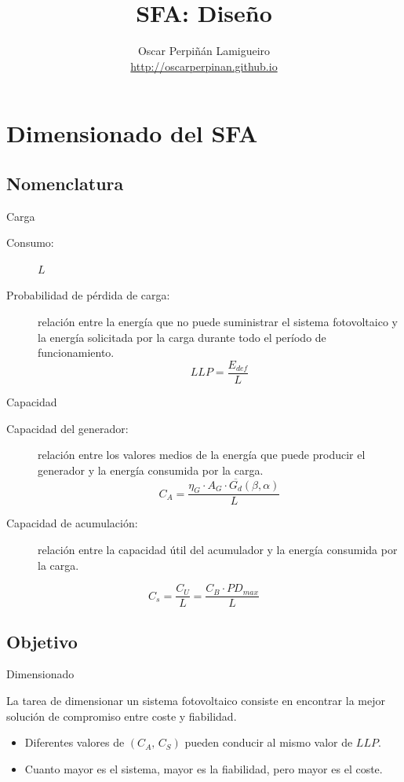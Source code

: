 \documentclass[xcolor={usenames,svgnames,dvipsnames}]{beamer}
\author{Oscar Perpiñán Lamigueiro \\ \url{http://oscarperpinan.github.io}}
\date{}
\title{SFA: Diseño}
\begin{document}
\maketitle

\section{Dimensionado del SFA}
\label{sec-1}

\subsection{Nomenclatura}
\label{sec-1-1}
\begin{frame}[label=sec-1-1-1]{Carga}
\begin{description}
\item[{Consumo:}] $L$

\item[{Probabilidad de pérdida de carga:}] relación entre la energía que no
puede suministrar el sistema fotovoltaico y la energía solicitada por
la carga durante todo el período de
funcionamiento.$$LLP=\frac{E_{def}}{L}$$
\end{description}
\end{frame}

\begin{frame}[label=sec-1-1-2]{Capacidad}
\begin{description}
\item[{Capacidad del generador:}] relación entre los valores medios de la
energía que puede producir el generador y la energía consumida por la
carga.
$$C_{A}=\frac{\eta_{G}\cdot A_{G}\cdot\overline{G_{d}}(\beta,\alpha)}{L}$$

\item[{Capacidad de acumulación:}] relación entre la capacidad útil del acumulador y la energía consumida por la carga.
\end{description}
$$C_{s}=\frac{C_{U}}{L}=\frac{C_{B}\cdot PD_{max}}{L}$$
\end{frame}

\subsection{Objetivo}
\label{sec-1-2}
\begin{frame}[label=sec-1-2-1]{Dimensionado}
\begin{block}{La tarea de dimensionar un sistema fotovoltaico consiste en encontrar la mejor solución de compromiso entre coste y fiabilidad.}
\begin{itemize}
\item Diferentes valores de $(C_{A},\, C_{S})$ pueden conducir al mismo
valor de $LLP$.

\item Cuanto mayor es el sistema, mayor es la fiabilidad, pero mayor es el
coste.
\end{itemize}
\end{block}
\end{frame}
\end{document}

